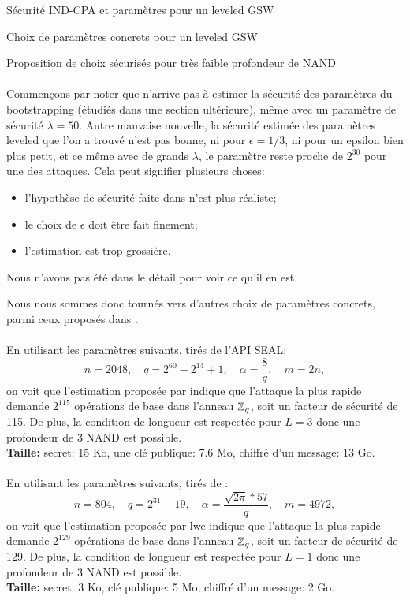 \begin{section}{Sécurité IND-CPA et paramètres pour un leveled GSW}
\begin{subsection}{Choix de paramètres concrets pour un leveled GSW}
\begin{subsubsection}{Proposition de choix sécurisés pour très faible profondeur de NAND}
\paragraph{}

Commençons par noter que  n'arrive pas à estimer la sécurité des paramètres du bootstrapping (étudiés
dans une section ultérieure), même 
avec un paramètre de sécurité $\lambda = 50$. Autre mauvaise nouvelle, la sécurité estimée des paramètres leveled que l'on a trouvé
n'est pas bonne, ni pour $\epsilon = 1/3$, ni pour un epsilon bien plus petit, et ce même avec de grands $\lambda$, 
le paramètre  reste proche de $2^{30}$ pour une des attaques. Cela peut signifier plusieurs choses:
\begin{itemize}
\item l'hypothèse de sécurité faite dans \cite{halevi} n'est plus réaliste;
\item le choix de $\epsilon$ doit être fait finement;
\item l'estimation est trop grossière.
\end{itemize}
Nous n'avons pas été dans le détail pour voir ce qu'il en est.

Nous nous sommes donc tournés vers d'autres choix de paramètres concrets, parmi ceux proposés dans \cite{estimator}.

\paragraph{}
En utilisant les paramètres suivants, tirés de l'API SEAL: 
\[n = 2048,\quad q = 2^{60} - 2^{14} + 1, \quad \alpha = \frac{8}{q},\quad m = 2n, \] 
on voit que l'estimation proposée par  indique que l'attaque la plus rapide demande $2^{115}$
opérations de base dans l'anneau $\mathbb{Z}_q$, soit un facteur de sécurité de 115. De plus, la condition de longueur
est respectée pour $L=3$ donc une profondeur de 3 NAND est possible. \\ 
\textbf{Taille:} secret: 15 Ko, une clé publique: 7.6 Mo, chiffré d'un message: 13 Go.

\paragraph{}
En utilisant les paramètres suivants, tirés de \cite{cryptoeprint:2015:755}:
\[n = 804,\quad  q = 2^{31} - 19,\quad \alpha = \frac{\sqrt{2\pi}*57}{q},\quad m = 4972,\]
on voit que l'estimation proposée par lwe indique que l'attaque la plus rapide demande $2^{129}$ opérations de base dans
l'anneau $\mathbb{Z}_q$, soit un facteur de sécurité de 129. De plus, la condition de longueur
est respectée pour $L=1$ donc une profondeur de 3 NAND est possible. \\ 
\textbf{Taille:} secret: 3 Ko, clé publique: 5 Mo, chiffré d'un message: 2 Go.
\end{subsubsection}
\end{subsection}
\end{section}
